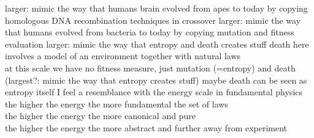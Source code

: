 \documentclass{article}\usepackage[margin=2cm]{geometry}
\begin{document}
\begin{cascade}
    \stepout
    larger: mimic the way that humans brain evolved from apes to today
    \stepin
    by copying homologous DNA recombination techniques in crossover
    \stepout
    larger: mimic the way that humans evolved from bacteria to today
    \stepin
    by copying mutation and fitness evaluation
    \stepout
    larger: mimic the way that entropy and death creates stuff
    \stepin
    death here involves a model of an environment together with natural laws\\
    at this scale we have no fitness measure, just mutation (=entropy) and death
    \stepout
    (largest?: mimic the way that entropy creates stuff)
    \stepin
    maybe death can be seen as entropy itself
    \stepout
    \stepout
    I feel a resemblance with the energy scale in fundamental physics
    \stepin
    the higher the energy the more fundamental the set of laws\\
    the higher the energy the more canonical and pure\\
    the higher the energy the more abstract and further away from experiment
\end{cascade}
\end{document}
